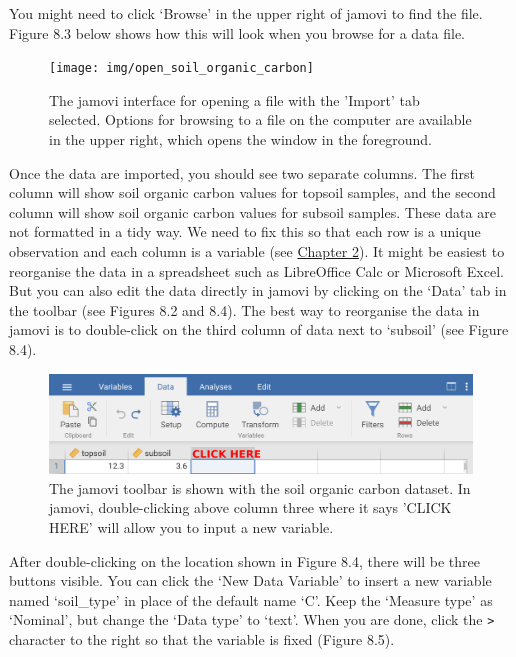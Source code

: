 \documentclass[
]{scrbook}
\begin{document}
You might need to click `Browse' in the upper right of jamovi to find the file.
Figure 8.3 below shows how this will look when you browse for a data file.

\begin{figure}
\texttt{[image: img/open\_soil\_organic\_carbon]} \caption{The jamovi interface for opening a file with the 'Import' tab selected. Options for browsing to a file on the computer are available in the upper right, which opens the window in the foreground.}\label{fig:unnamed-chunk-26}
\end{figure}

Once the data are imported, you should see two separate columns.
The first column will show soil organic carbon values for topsoil samples, and the second column will show soil organic carbon values for subsoil samples.
These data are not formatted in a tidy way.
We need to fix this so that each row is a unique observation and each column is a variable (see \protect\hyperlink{Chapter_2}{Chapter 2}).
It might be easiest to reorganise the data in a spreadsheet such as LibreOffice Calc or Microsoft Excel.
But you can also edit the data directly in jamovi by clicking on the `Data' tab in the toolbar (see Figures 8.2 and 8.4).
The best way to reorganise the data in jamovi is to double-click on the third column of data next to `subsoil' (see Figure 8.4).

\begin{figure}
\includegraphics[width=1\linewidth]{img/jamovi_new_variable} \caption{The jamovi toolbar is shown with the soil organic carbon dataset. In jamovi, double-clicking above column three where it says 'CLICK HERE' will allow you to input a new variable.}\label{fig:unnamed-chunk-27}
\end{figure}

After double-clicking on the location shown in Figure 8.4, there will be three buttons visible.
You can click the `New Data Variable' to insert a new variable named `soil\_type' in place of the default name `C'.
Keep the `Measure type' as `Nominal', but change the `Data type' to `text'.
When you are done, click the \texttt{\textgreater{}} character to the right so that the variable is fixed (Figure 8.5).
\end{document}
